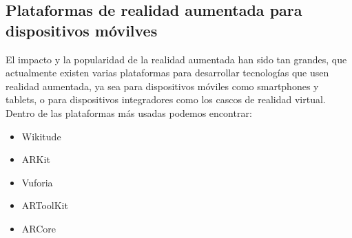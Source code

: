 \subsection{Plataformas de realidad aumentada para dispositivos móvilves}
El impacto y la popularidad de la realidad aumentada han sido tan grandes, que actualmente existen varias plataformas para desarrollar tecnologías que usen realidad aumentada, ya sea para dispositivos móviles como smartphones y tablets, o para dispositivos integradores como los cascos de realidad virtual. Dentro de las plataformas más usadas podemos encontrar:
\begin{itemize}
	\item Wikitude
	\item ARKit
	\item Vuforia
	\item ARToolKit
	\item ARCore
\end{itemize}
\newpage

